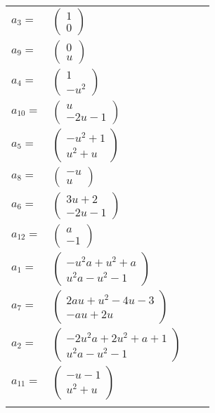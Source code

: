 \documentclass[1p]{elsarticle_modified}
\theoremstyle{definition}
\begin{document}
\begin{tabular}{m{7pt} m{180pt} m{7pt} m{180pt} }
\flushright $a_{3}=$&$\begin{pmatrix}1\\0\end{pmatrix}$ \\
\flushright $a_{9}=$&$\begin{pmatrix}0\\u\end{pmatrix}$ \\
\flushright $a_{4}=$&$\begin{pmatrix}1\\- u^2\end{pmatrix}$ \\
\flushright $a_{10}=$&$\begin{pmatrix}u\\-2 u-1\end{pmatrix}$ \\
\flushright $a_{5}=$&$\begin{pmatrix}- u^2+1\\u^2+u\end{pmatrix}$ \\
\flushright $a_{8}=$&$\begin{pmatrix}- u\\u\end{pmatrix}$ \\
\flushright $a_{6}=$&$\begin{pmatrix}3 u+2\\-2 u-1\end{pmatrix}$ \\
\flushright $a_{12}=$&$\begin{pmatrix}a\\-1\end{pmatrix}$ \\
\flushright $a_{1}=$&$\begin{pmatrix}- u^2 a+u^2+a\\u^2 a- u^2-1\end{pmatrix}$ \\
\flushright $a_{7}=$&$\begin{pmatrix}2 a u+u^2-4 u-3\\- a u+2 u\end{pmatrix}$ \\
\flushright $a_{2}=$&$\begin{pmatrix}-2 u^2 a+2 u^2+a+1\\u^2 a- u^2-1\end{pmatrix}$ \\
\flushright $a_{11}=$&$\begin{pmatrix}- u-1\\u^2+u\end{pmatrix}$\\&\end{tabular}
\end{document}
